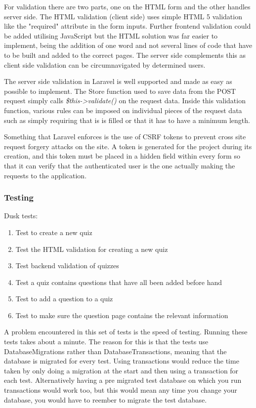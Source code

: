 For validation there are two parts, one on the HTML form and the other handles server side. The HTML validation (client side) uses simple HTML 5 validation like the "required" attribute in the form inputs. Further frontend validation could be added utilising JavaScript but the HTML solution was far easier to implement, being the addition of one word and not several lines of code that have to be built and added to the correct pages. The server side complements this as client side validation can be circumnavigated by determined users.

The server side validation in Laravel is well supported and made as easy as possible to implement. The Store function used to save data from the POST request simply calls \textit{\$this-\textgreater validate()} on the request data. Inside this validation function, various rules can be imposed on individual pieces of the request data such as simply requiring that is is filled or that it has to have a minimum length\cite{laravel-validation}.

Something that Laravel enforces is the use of CSRF tokens to prevent cross site request forgery attacks on the site. A token is generated for the project during its creation, and this token must be placed in a hidden field within every form so that it can verify that the authenticated user is the one actually making the requests to the application\cite{laravel-csrf}.
\subsubsection{Testing}
Dusk tests:
\begin{enumerate}
	\item Test to create a new quiz
	\item Test the HTML validation for creating a new quiz
	\item Test backend validation of quizzes
	\item Test a quiz contains questions that have all been added before hand
	\item Test to add a question to a quiz
	\item Test to make sure the question page contains the relevant information
\end{enumerate}
A problem encountered in this set of tests is the speed of testing. Running these tests takes about a minute. The reason for this is that the tests use DatabaseMigrations rather than DatabaseTransactions, meaning that the database is migrated for every test. Using transactions would reduce the time taken by only doing a migration at the start and then using a transaction for each test. Alternatively having a pre migrated test database on which you run transactions would work too, but this would mean any time you change your database, you would have to reember to migrate the test database. 

